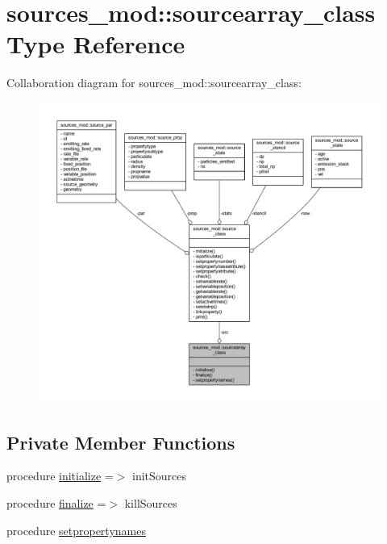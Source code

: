 \hypertarget{structsources__mod_1_1sourcearray__class}{}\section{sources\+\_\+mod\+:\+:sourcearray\+\_\+class Type Reference}
\label{structsources__mod_1_1sourcearray__class}


Collaboration diagram for sources\+\_\+mod\+:\+:sourcearray\+\_\+class\+:\nopagebreak
\begin{figure}[H]
\begin{center}
\leavevmode
\includegraphics[width=350pt]{structsources__mod_1_1sourcearray__class__coll__graph}
\end{center}
\end{figure}
\subsection*{Private Member Functions}
\begin{DoxyCompactItemize}
\item 
procedure \mbox{\hyperlink{structsources__mod_1_1sourcearray__class_a12178d9809ca8ccdf0de690fcc018050}{initialize}} =$>$ init\+Sources
\item 
procedure \mbox{\hyperlink{structsources__mod_1_1sourcearray__class_a340d2ef95d4040b358f872c3a74c9bf4}{finalize}} =$>$ kill\+Sources
\item 
procedure \mbox{\hyperlink{structsources__mod_1_1sourcearray__class_afb2019a51e85dc19c66bf78e7b0b51c2}{setpropertynames}}
\end{DoxyCompactItemize}
